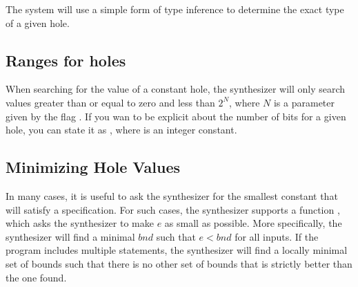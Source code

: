 The system will use a simple form of type inference to determine the exact type of a given hole.

\subsection{Ranges for holes}
When searching for the value of a constant hole, the synthesizer will only search values greater than or equal to zero and less than $2^N$, where $N$ is a parameter given by the flag . If you wan to be explicit about the number of bits for a given hole, you can state it as , where  is an integer constant.



\subsection{Minimizing Hole Values}
In many cases, it is useful to ask the synthesizer for the smallest constant that will satisfy a specification. For such cases, the synthesizer supports a function , which asks the synthesizer to make $e$ as small as possible. More specifically, the synthesizer will find a minimal $bnd$ such that $e < bnd$ for all inputs. If the program includes multiple  statements, the synthesizer will find a locally minimal set of bounds such that there is no other set of bounds that is strictly better than the one found. 



